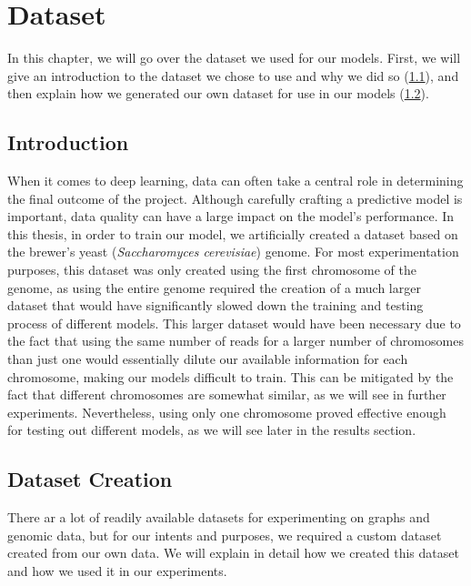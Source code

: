 \documentclass[times, utf8, diplomski, english]{fer_eng}
\begin{document}
\chapter{Dataset}
\label{ch:dataset}

In this chapter, we will go over the dataset we used for our models. First, we will give an introduction to the dataset we chose to use and why we did so (\ref{sec:introduction}), and then explain how we generated our own dataset for use in our models (\ref{sec:dataset creation}).

\section{Introduction}
\label{sec:introduction}

When it comes to deep learning, data can often take a central role in determining the final outcome of the project. Although carefully crafting a predictive model is important, data quality can have a large impact on the model's performance. In this thesis, in order to train our model, we artificially created a dataset based on the brewer's yeast (\textit{Saccharomyces cerevisiae}) genome. For most experimentation purposes, this dataset was only created using the first chromosome of the genome, as using the entire genome required the creation of a much larger dataset that would have significantly slowed down the training and testing process of different models. This larger dataset would have been necessary due to the fact that using the same number of reads for a larger number of chromosomes than just one would essentially dilute our available information for each chromosome, making our models difficult to train. This can be mitigated by the fact that different chromosomes are somewhat similar, as we will see in further experiments. Nevertheless, using only one chromosome proved effective enough for testing out different models, as we will see later in the results section.

\section{Dataset Creation}
\label{sec:dataset creation}

There ar a lot of readily available datasets for experimenting on graphs and genomic data, but for our intents and purposes, we required a custom dataset created from our own data. We will explain in detail how we created this dataset and how we used it in our experiments.
\end{document}
